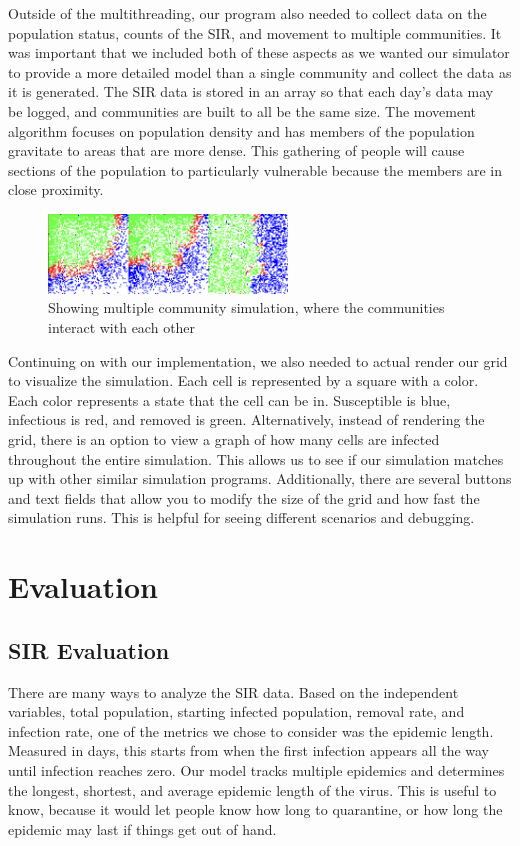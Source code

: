 \documentclass[conference]{IEEEtran}
\begin{document}
Outside of the multithreading, our program also needed to collect data on the population status, counts of the SIR, and movement to multiple communities. It was important that we included both of these aspects as we wanted our simulator to provide a more detailed model than a single community and collect the data as it is generated. The SIR data is stored in an array so that each day's data may be logged, and communities are built to all be the same size. The movement algorithm focuses on population density and has members of the population gravitate to areas that are more dense. This gathering of people will cause sections of the population to particularly vulnerable because the members are in close proximity.

\begin{figure}[!hbt]
\centering
\includegraphics[width=2.5in]{Figures/multiCommunity.png}
\caption{Showing multiple community simulation, where the communities interact with each other}
\label{fig_sim}
\end{figure}

Continuing on with our implementation, we also needed to actual render our grid to visualize the simulation. Each cell is represented by a square with a color. Each color represents a state that the cell can be in. Susceptible is blue, infectious is red, and removed is green. Alternatively, instead of rendering the grid, there is an option to view a graph of how many cells are infected throughout the entire simulation. This allows us to see if our simulation matches up with other similar simulation programs. Additionally, there are several buttons and text fields that allow you to modify the size of the grid and how fast the simulation runs. This is helpful for seeing different scenarios and debugging.

\section{Evaluation}

\subsection{SIR Evaluation}

There are many ways to analyze the SIR data. Based on the independent variables, total population, starting infected population, removal rate, and infection rate, one of the metrics we chose to consider was the epidemic length. Measured in days, this starts from when the first infection appears all the way until infection reaches zero. Our model tracks multiple epidemics and determines the longest, shortest, and average epidemic length of the virus. This is useful to know, because it would let people know how long to quarantine, or how long the epidemic may last if things get out of hand.
\end{document}
